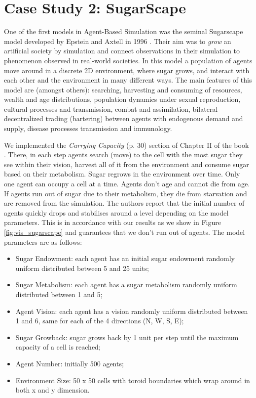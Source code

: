 \section{Case Study 2: SugarScape}
\label{sec:cs_sugarscape}

One of the first models in Agent-Based Simulation was the seminal Sugarscape model developed by Epstein and Axtell in 1996 \cite{epstein_growing_1996}. Their aim was to \textit{grow} an artificial society by simulation and connect observations in their simulation to phenomenon observed in real-world societies. In this model a population of agents move around in a discrete 2D environment, where sugar grows, and interact with each other and the environment in many different ways. The main features of this model are (amongst others): searching, harvesting and consuming of resources, wealth and age distributions, population dynamics under sexual reproduction, cultural processes and transmission, combat and assimilation, bilateral decentralized trading (bartering) between agents with endogenous demand and supply, disease processes transmission and immunology.

We implemented the \textit{Carrying Capacity} (p. 30) section of Chapter II of the book \cite{epstein_growing_1996}. There, in each step agents search (move) to the cell with the most sugar they see within their vision, harvest all of it from the environment and consume sugar based on their metabolism. Sugar regrows in the environment over time. Only one agent can occupy a cell at a time. Agents don't age and cannot die from age. If agents run out of sugar due to their metabolism, they die from starvation and are removed from the simulation. The authors report that the initial number of agents quickly drops and stabilises around a level depending on the model parameters. This is in accordance with our results as we show in Figure \ref{fig:vis_sugarscape} and guarantees that we don't run out of agents. The model parameters are as follows:

\begin{itemize}
	\item Sugar Endowment: each agent has an initial sugar endowment randomly uniform distributed between 5 and 25 units;
	\item Sugar Metabolism: each agent has a sugar metabolism randomly uniform distributed between 1 and 5;
	\item Agent Vision: each agent has a vision randomly uniform distributed between 1 and 6, same for each of the 4 directions (N, W, S, E);
	\item Sugar Growback: sugar grows back by 1 unit per step until the maximum capacity of a cell is reached;
	\item Agent Number: initially 500 agents;
	\item Environment Size: 50 x 50 cells with toroid boundaries which wrap around in both x and y dimension.
\end{itemize}

